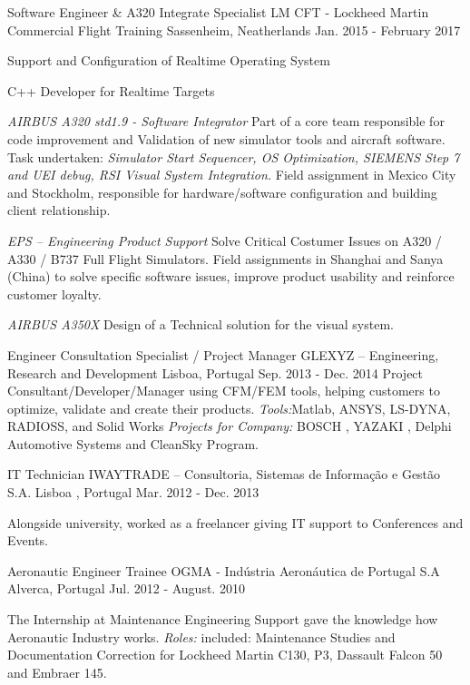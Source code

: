 \begin{cventries}
  \cventry
    {Software Engineer \& A320 Integrate Specialist}
    {LM CFT - Lockheed Martin Commercial Flight Training}
    {Sassenheim, Neatherlands}
    {Jan. 2015 - February 2017}
    {          
      \begin{cvitems}     
      \item{Support and Configuration of Realtime Operating System}
      \item{C++ Developer for Realtime Targets }
      \item {\textit{ AIRBUS A320 std1.9 - Software Integrator} Part of a core team responsible for code improvement and Validation of new simulator tools and aircraft software. Task undertaken: \textit{Simulator Start Sequencer, OS Optimization, SIEMENS Step 7 and  UEI debug, RSI Visual System Integration.} 
      Field assignment in Mexico City and Stockholm, responsible for hardware/software configuration and building client relationship.}
    \item {\textit{EPS – Engineering Product Support} Solve Critical Costumer  Issues on A320 / A330 / B737 Full Flight Simulators. Field assignments in Shanghai and Sanya (China) to  solve specific software issues, improve product usability and reinforce customer loyalty.}
       \item {\textit{AIRBUS A350X}  Design of a Technical solution for the visual system.}
       \end{cvitems}
    }


\cventry
    {Engineer Consultation Specialist / Project Manager}
    {GLEXYZ – Engineering, Research and Development}
    {Lisboa, Portugal}
    {Sep. 2013 - Dec. 2014}
    {
Project Consultant/Developer/Manager using CFM/FEM tools, helping customers to optimize, validate and create their products. \textit{Tools:}Matlab, ANSYS, LS-DYNA, RADIOSS, and Solid Works
\textit{Projects for Company:} BOSCH , YAZAKI , Delphi Automotive Systems and CleanSky Program.
    }
    
    
  \cventry
    {IT Technician}
    {IWAYTRADE – Consultoria, Sistemas de Informação e Gestão S.A.}
    {Lisboa , Portugal}
    {Mar. 2012 - Dec. 2013}
    {
      \begin{cvitems}
        \item {Alongside university, worked as a freelancer giving IT support to Conferences and Events.        }
      \end{cvitems} 
    }
  \cventry
    {Aeronautic Engineer Trainee}
    {OGMA - Indústria Aeronáutica de Portugal S.A}
    {Alverca, Portugal}
    {Jul. 2012 - August. 2010}
    {
      \begin{cvitems}
        \item {The Internship at Maintenance Engineering Support gave the knowledge how Aeronautic Industry works. \textit{Roles:} included: Maintenance Studies and Documentation Correction for Lockheed Martin C130, P3, Dassault Falcon 50 and Embraer 145.}
      \end{cvitems}
    }
\end{cventries}
